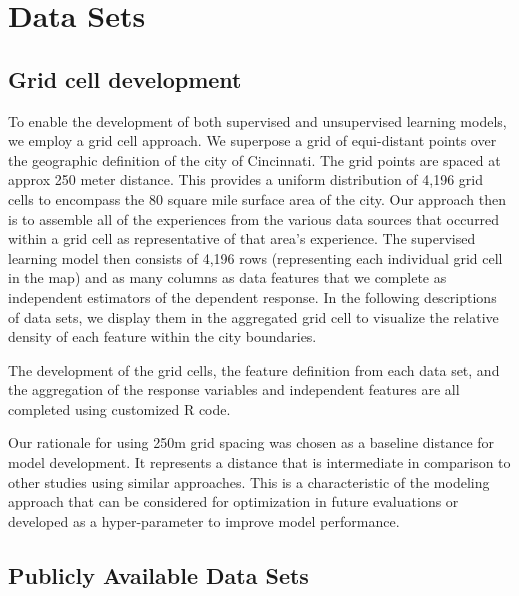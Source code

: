 \documentclass{llncs}
\begin{document}
\section{Data Sets}


\subsection{Grid cell development}

To enable the development of both supervised and unsupervised learning models, we employ a grid cell approach. We superpose a grid of equi-distant points over the geographic definition of the city of Cincinnati. The grid points are spaced at approx 250 meter distance. This provides a uniform distribution of 4,196 grid cells to encompass the 80 square mile surface area of the city. Our approach then is to assemble all of the experiences from the various data sources that occurred within a grid cell as representative of that area's experience. The supervised learning model then consists of 4,196 rows (representing each individual grid cell in the map) and as many columns as data features that we complete as independent estimators of the dependent response. In the following descriptions of data sets, we display them in the aggregated grid cell to visualize the relative density of each feature within the city boundaries. 

The development of the grid cells, the feature definition from each data set, and the aggregation of the response variables and independent features are all completed using customized R code.

Our rationale for using 250m grid spacing was chosen as a baseline distance for model development. It represents a distance that is intermediate in comparison to other studies using similar approaches\cite{xie2017analysis}. This is a characteristic of the modeling approach that can be considered for optimization in future evaluations or developed as a hyper-parameter to improve model performance.


\subsection{Publicly Available Data Sets}
\end{document}
